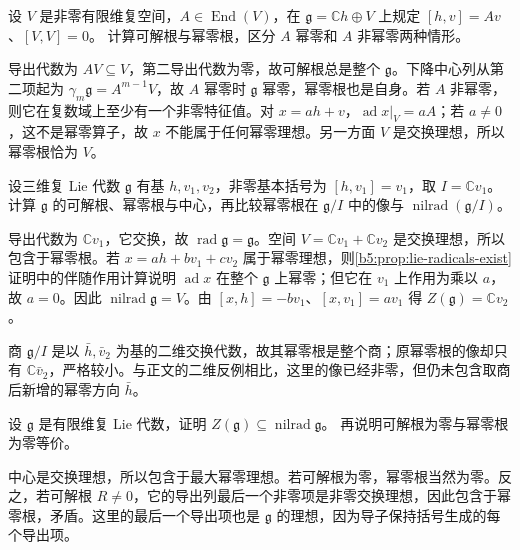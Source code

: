 \begin{exercise}\label{b5:ex:12-almost-abelian-radicals}
	设 \(V\) 是非零有限维复空间，\(A\in\operatorname{End}(V)\)，在 \(\mathfrak g=\mathbb Ch\oplus V\) 上规定 \([h,v]=Av\)、\([V,V]=0\)。 计算可解根与幂零根，区分 \(A\) 幂零和 \(A\) 非幂零两种情形。
\end{exercise}
\begin{solution}
	导出代数为 \(AV\subseteq V\)，第二导出代数为零，故可解根总是整个 \(\mathfrak g\)。下降中心列从第二项起为 \(\gamma_m\mathfrak g=A^{m-1}V\)，故 \(A\) 幂零时 \(\mathfrak g\) 幂零，幂零根也是自身。若 \(A\) 非幂零，则它在复数域上至少有一个非零特征值。对 \(x=ah+v\)，\(\operatorname{ad}x|_V=aA\)；若 \(a\ne0\)，这不是幂零算子，故 \(x\) 不能属于任何幂零理想。另一方面 \(V\) 是交换理想，所以幂零根恰为 \(V\)。
\end{solution}

\begin{exercise}\label{b5:ex:12-nilradical-quotient}
	设三维复 Lie 代数 \(\mathfrak g\) 有基 \(h,v_1,v_2\)，非零基本括号为 \([h,v_1]=v_1\)，取 \(I=\mathbb Cv_1\)。计算 \(\mathfrak g\) 的可解根、幂零根与中心，再比较幂零根在 \(\mathfrak g/I\) 中的像与 \(\operatorname{nilrad}(\mathfrak g/I)\)。
\end{exercise}
\begin{solution}
	导出代数为 \(\mathbb Cv_1\)，它交换，故 \(\operatorname{rad}\mathfrak g=\mathfrak g\)。空间 \(V=\mathbb Cv_1+\mathbb Cv_2\) 是交换理想，所以包含于幂零根。若 \(x=ah+bv_1+cv_2\) 属于幂零理想，则\cref{b5:prop:lie-radicals-exist}证明中的伴随作用计算说明 \(\operatorname{ad}x\) 在整个 \(\mathfrak g\) 上幂零；但它在 \(v_1\) 上作用为乘以 \(a\)，故 \(a=0\)。因此 \(\operatorname{nilrad}\mathfrak g=V\)。由 \([x,h]=-bv_1\)、\([x,v_1]=av_1\) 得 \(Z(\mathfrak g)=\mathbb Cv_2\)。

	商 \(\mathfrak g/I\) 是以 \(\bar h,\bar v_2\) 为基的二维交换代数，故其幂零根是整个商；原幂零根的像却只有 \(\mathbb C\bar v_2\)，严格较小。与正文的二维反例相比，这里的像已经非零，但仍未包含取商后新增的幂零方向 \(\bar h\)。
\end{solution}

\begin{exercise}\label{b5:ex:12-center-nilradical}
	设 \(\mathfrak g\) 是有限维复 Lie 代数，证明 \(Z(\mathfrak g)\subseteq\operatorname{nilrad}\mathfrak g\)。 再说明可解根为零与幂零根为零等价。
\end{exercise}
\begin{solution}
	中心是交换理想，所以包含于最大幂零理想。若可解根为零，幂零根当然为零。反之，若可解根 \(R\ne0\)，它的导出列最后一个非零项是非零交换理想，因此包含于幂零根，矛盾。这里的最后一个导出项也是 \(\mathfrak g\) 的理想，因为导子保持括号生成的每个导出项。
\end{solution}

